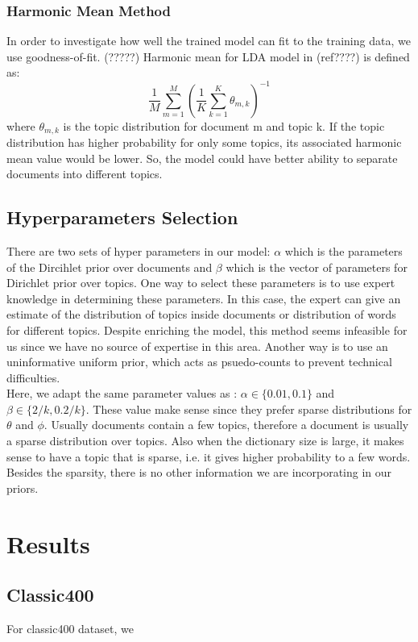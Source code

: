 \documentclass[twoside,12pt]{article}
\begin{document}
\subsubsection{Harmonic Mean Method}
In order to investigate how well the trained model can fit to the training data, we use goodness-of-fit. (?????) Harmonic mean for LDA model in (ref????) is defined as:
\begin{equation}
\frac{1}{M}\sum_{m=1}^{M}(\frac{1}{K}\sum_{k=1}^{K}\theta_{m,k})^{-1}
\end{equation}
where $\theta_{m,k}$ is the topic distribution for document m and topic k. If the topic distribution has higher probability for only some topics, its associated harmonic mean value would be lower. So, the model could have better ability to separate documents into different topics.


\subsection{Hyperparameters Selection}
There are two sets of hyper parameters in our model: $\alpha$ which is the parameters of the Dircihlet prior over documents and $\beta$ which is the vector of parameters for Dirichlet prior over topics. One way to select these parameters is to use expert knowledge in determining these parameters. In this case, the expert can give an estimate of the distribution of topics inside documents or distribution of words for different topics. Despite enriching the model, this method seems infeasible for us since we have no source of expertise in this area. Another way is to use an uninformative uniform prior, which acts as psuedo-counts to prevent technical difficulties.\\
Here, we adapt the same parameter values as \cite{fastlda}: $\alpha \in \{0.01,0.1\}$ and $\beta\in\{2/k,0.2/k\}$. These value make sense since they prefer sparse distributions for $\theta$ and $\phi$. Usually documents contain a few topics, therefore a document is usually a sparse distribution over topics. Also when the dictionary size is large, it makes sense to have a topic that is sparse, i.e. it gives higher probability to a few words. Besides the sparsity, there is no other information we are incorporating in our priors. 

\section{Results}


\subsection{Classic400}
For classic400 dataset, we 
\end{document}
